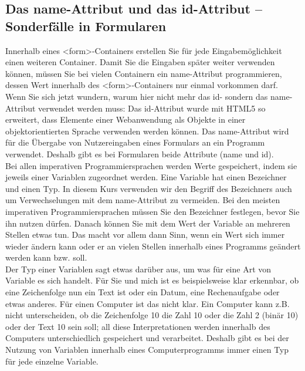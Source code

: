 \subsection{Das name-Attribut und das id-Attribut – Sonderfälle in Formularen}

Innerhalb eines <form>-Containers erstellen Sie für jede Eingabemöglichkeit einen weiteren Container. Damit Sie die Eingaben später weiter verwenden können, müssen Sie bei vielen Containern ein name-Attribut programmieren, dessen Wert innerhalb des <form>-Containers nur einmal vorkommen darf. \\

Wenn Sie sich jetzt wundern, warum hier nicht mehr das id- sondern das name-Attribut verwendet werden muss: Das id-Attribut wurde mit HTML5 so erweitert, dass Elemente einer Webanwendung als Objekte in einer objektorientierten Sprache verwenden werden können. Das name-Attribut wird für die Übergabe von Nutzereingaben eines Formulars an ein Programm verwendet. Deshalb gibt es bei Formularen beide Attribute (name und id).\\

Bei allen imperativen Programmiersprachen werden Werte gespeichert, indem sie jeweils einer Variablen zugeordnet werden. Eine Variable hat einen Bezeichner und einen Typ. In diesem Kurs verwenden wir den Begriff des Bezeichners auch um Verwechselungen mit dem name-Attribut zu vermeiden. Bei den meisten imperativen Programmiersprachen müssen Sie den Bezeichner festlegen, bevor Sie ihn nutzen dürfen. Danach können Sie mit dem Wert der Variable an mehreren Stellen etwas tun. Das macht vor allem dann Sinn, wenn ein Wert sich immer wieder ändern kann oder er an vielen Stellen innerhalb eines Programms geändert werden kann bzw. soll. \\

Der Typ einer Variablen sagt etwas darüber aus, um was für eine Art von Variable es sich handelt. Für Sie und mich ist es beispielsweise klar erkennbar, ob eine Zeichenfolge nun ein Text ist oder ein Datum, eine Rechenaufgabe oder etwas anderes. Für einen Computer ist das nicht klar. Ein Computer kann z.B. nicht unterscheiden, ob die Zeichenfolge 10 die Zahl 10 oder die Zahl 2 (binär 10) oder der Text 10 sein soll; all diese Interpretationen werden innerhalb des Computers unterschiedlich gespeichert und verarbeitet. Deshalb gibt es bei der Nutzung von Variablen innerhalb eines Computerprogramms immer einen Typ für jede einzelne Variable.\\

